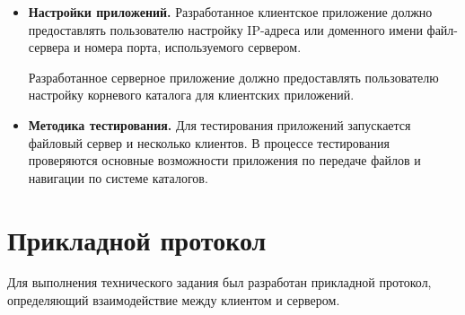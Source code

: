 \begin{itemize}
	\item \textbf{Настройки приложений.} Разработанное клиентское приложение должно предоставлять пользователю настройку IP-адреса или доменного имени файл-сервера и номера порта, используемого сервером.
	
	Разработанное серверное приложение должно предоставлять пользователю настройку корневого каталога для клиентских приложений.

	\item \textbf{Методика тестирования.} Для тестирования приложений запускается файловый сервер и несколько клиентов. В процессе тестирования проверяются основные возможности приложения по передаче файлов и навигации по системе каталогов.

\end{itemize}

\newpage

\section{Прикладной протокол}

Для выполнения технического задания был разработан прикладной протокол, определяющий взаимодействие между клиентом и сервером.

